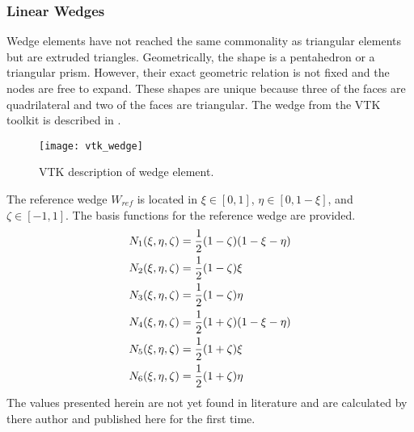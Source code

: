     \subsubsection{Linear Wedges}
      Wedge elements have not reached the same commonality as triangular 
      elements but are extruded triangles. Geometrically, the shape is a 
      pentahedron or a triangular prism. However, their exact geometric
      relation is not fixed and the nodes are free to expand. These shapes 
      are unique because three of the faces are quadrilateral and two of
      the faces are triangular. The wedge from the VTK toolkit is described in
       \cite{vtk}.
      \begin{figure}
        \centering
        \texttt{[image: vtk\_wedge]}
        \caption{VTK description of wedge element.}
        \label{fig:vtk_wedge}
      \end{figure}
      The reference wedge $W_{ref}$ is located in 
      $\xi \in [0,1]$, $\eta \in [0,1-\xi]$, and $\zeta \in [-1,1]$. The basis
      functions for the reference wedge are provided.
      \begin{align}
        N_1(\xi,\eta,\zeta) &= \frac{1}{2} (1-\zeta)(1-\xi-\eta) \\
        N_2(\xi,\eta,\zeta) &= \frac{1}{2} (1-\zeta)\xi \\
        N_3(\xi,\eta,\zeta) &= \frac{1}{2} (1-\zeta)\eta \\
        N_4(\xi,\eta,\zeta) &= \frac{1}{2} (1+\zeta)(1-\xi-\eta) \\
        N_5(\xi,\eta,\zeta) &= \frac{1}{2} (1+\zeta)\xi \\
        N_6(\xi,\eta,\zeta) &= \frac{1}{2} (1+\zeta)\eta 
      \end{align}
      The values presented herein are not yet found in literature and are 
      calculated by there author and published here for the first time.
